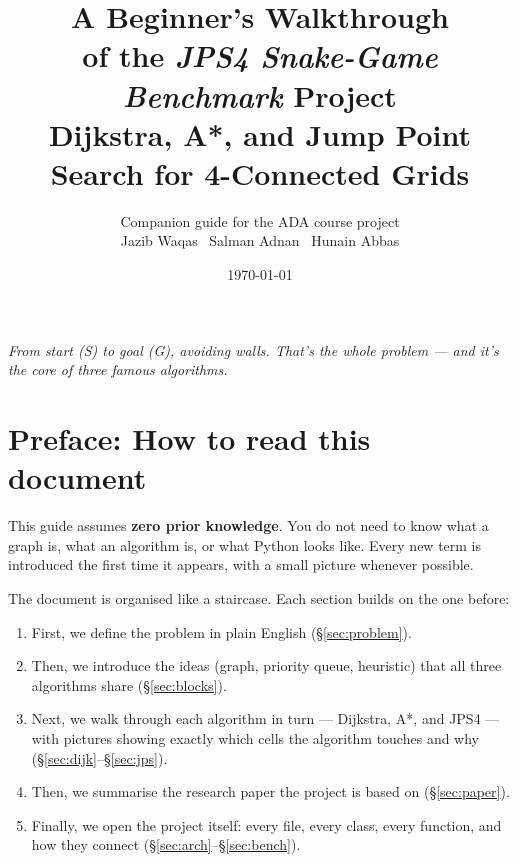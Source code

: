 \documentclass[11pt,a4paper]{article}
\title{\vspace{-1.2cm}\color{accent}\textbf{A Beginner's Walkthrough}\\[2pt]
\large of the \emph{JPS4 Snake-Game Benchmark} Project\\[6pt]
{\normalsize Dijkstra, A*, and Jump Point Search for 4-Connected Grids}}
\author{Companion guide for the ADA course project\\
\small Jazib Waqas \textperiodcentered\ Salman Adnan \textperiodcentered\ Hunain Abbas}
\date{\today}
\newcommand{\gridbase}[2]{%
  \draw[step=0.6,gray!50,very thin] (0,0) grid (#1*0.6,#2*0.6);
  \draw[black,thick] (0,0) rectangle (#1*0.6,#2*0.6);
}
\newcommand{\fillcell}[3]{%
  \fill[#3] (#1*0.6,#2*0.6) rectangle ({(#1+1)*0.6},{(#2+1)*0.6});
  \draw[gray!50,very thin] (#1*0.6,#2*0.6) rectangle ({(#1+1)*0.6},{(#2+1)*0.6});
}
\newcommand{\celltext}[3]{%
  \node at ({(#1+0.5)*0.6},{(#2+0.5)*0.6}) {\footnotesize #3};
}
\begin{document}
\maketitle
\thispagestyle{empty}

\begin{center}

\vspace{4pt}\small
\textit{From start (S) to goal (G), avoiding walls. That's the whole problem --- and it's the core of three famous algorithms.}
\end{center}

\vspace{1em}
\tableofcontents
\clearpage

\section*{Preface: How to read this document}

This guide assumes \textbf{zero prior knowledge}. You do not need to know what a graph is, what an algorithm is, or what Python looks like. Every new term is introduced the first time it appears, with a small picture whenever possible.

The document is organised like a staircase. Each section builds on the one before:

\begin{enumerate}[leftmargin=20pt,itemsep=2pt]
  \item First, we define the problem in plain English (\S\ref{sec:problem}).
  \item Then, we introduce the ideas (graph, priority queue, heuristic) that all three algorithms share (\S\ref{sec:blocks}).
  \item Next, we walk through each algorithm in turn --- Dijkstra, A*, and JPS4 --- with pictures showing exactly which cells the algorithm touches and why (\S\ref{sec:dijk}--\S\ref{sec:jps}).
  \item Then, we summarise the research paper the project is based on (\S\ref{sec:paper}).
  \item Finally, we open the project itself: every file, every class, every function, and how they connect (\S\ref{sec:arch}--\S\ref{sec:bench}).
\end{enumerate}
\end{document}

